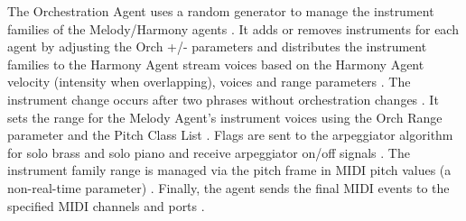 The Orchestration Agent uses a random generator to manage the instrument families of the Melody/Harmony agents \cite{lopez2023progressive}. It adds or removes instruments for each agent by adjusting the Orch +/- parameters and distributes the instrument families to the Harmony Agent stream voices based on the Harmony Agent velocity (intensity when overlapping), voices and range parameters \cite{lopez2023progressive}. The instrument change occurs after two phrases without orchestration changes \cite{lopez2023progressive}. It sets the range for the Melody Agent's instrument voices using the Orch Range parameter and the Pitch Class List \cite{lopez2023progressive}. Flags are sent to the arpeggiator algorithm for solo brass and solo piano and receive arpeggiator on/off signals \cite{lopez2023progressive}. The instrument family range is managed via the pitch frame in MIDI pitch values (a non-real-time parameter) \cite{lopez2023progressive}. Finally, the agent sends the final MIDI events to the specified MIDI channels and ports \cite{lopez2023progressive}.